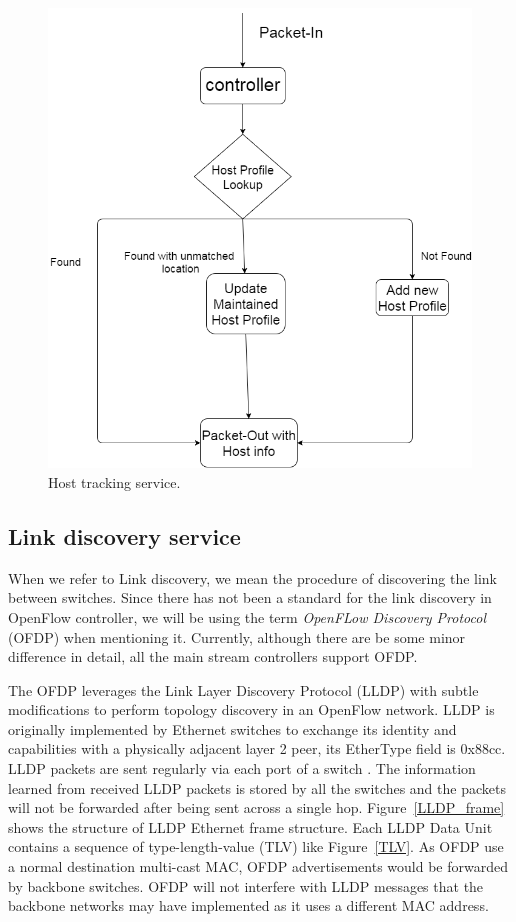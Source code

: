 \begin{figure}[H]
\begin{center} 
\includegraphics[width=1\textwidth]{figures/Host_tracking.png}
\end{center}
\caption{Host tracking service.}
\label{HTS}
\end{figure}

\subsection{Link discovery service}
\label{Link discovery service}
When we refer to Link discovery, we mean the procedure of discovering the link between switches. Since there has not been a standard for the link discovery in OpenFlow controller, we will be using the term \textit{OpenFLow Discovery Protocol} (OFDP) when mentioning it. Currently, although there are be some minor difference in detail, all the main stream controllers support OFDP.

The OFDP leverages the Link Layer Discovery Protocol (LLDP) with subtle modifications to perform topology discovery in an OpenFlow network. LLDP is originally implemented by Ethernet switches to exchange its identity and capabilities with a physically adjacent layer 2 peer, its EtherType field is 0x88cc. LLDP packets are sent regularly via each port of a switch \cite{LLDP_WS}. The information learned from received LLDP packets is stored by all the switches and the packets will not be forwarded after being sent across a single hop. Figure~\ref{LLDP_frame} shows the structure of LLDP Ethernet frame structure. Each LLDP Data Unit contains a sequence of type-length-value (TLV) like Figure~\ref{TLV}. As OFDP use a normal destination multi-cast MAC, OFDP advertisements would be forwarded by backbone switches. OFDP will not interfere with LLDP messages that the backbone networks may have implemented as it uses a different MAC address. \cite{OFDP_GENI}

